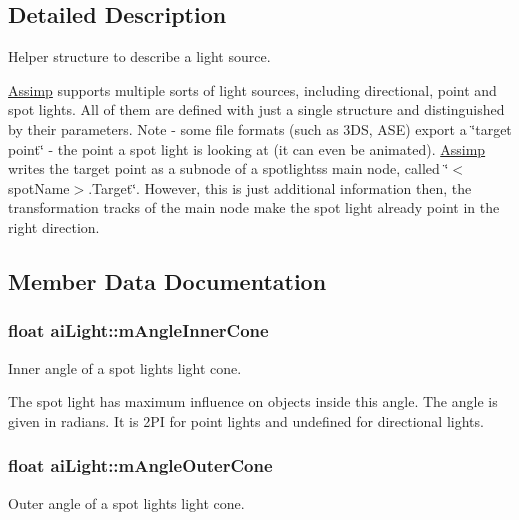 \subsection{Detailed Description}
Helper structure to describe a light source.

\hyperlink{namespace_assimp}{Assimp} supports multiple sorts of light sources, including directional, point and spot lights. All of them are defined with just a single structure and distinguished by their parameters. Note -\/ some file formats (such as 3\+DS, A\+SE) export a \char`\"{}target point\char`\"{} -\/ the point a spot light is looking at (it can even be animated). \hyperlink{namespace_assimp}{Assimp} writes the target point as a subnode of a spotlights\textquotesingle{}s main node, called \char`\"{}$<$spot\+Name$>$.\+Target\char`\"{}. However, this is just additional information then, the transformation tracks of the main node make the spot light already point in the right direction. 

\subsection{Member Data Documentation}
\subsubsection[{\texorpdfstring{m\+Angle\+Inner\+Cone}{mAngleInnerCone}}]{\setlength{\rightskip}{0pt plus 5cm}float ai\+Light\+::m\+Angle\+Inner\+Cone}\hypertarget{structai_light_abad0466811938623e98bf1d334143f9a}{}\label{structai_light_abad0466811938623e98bf1d334143f9a}
Inner angle of a spot light\textquotesingle{}s light cone.

The spot light has maximum influence on objects inside this angle. The angle is given in radians. It is 2\+PI for point lights and undefined for directional lights. 
\subsubsection[{\texorpdfstring{m\+Angle\+Outer\+Cone}{mAngleOuterCone}}]{\setlength{\rightskip}{0pt plus 5cm}float ai\+Light\+::m\+Angle\+Outer\+Cone}\hypertarget{structai_light_a20fd332a5f9d8e8cb94816ff2b0ae7f4}{}\label{structai_light_a20fd332a5f9d8e8cb94816ff2b0ae7f4}
Outer angle of a spot light\textquotesingle{}s light cone.

